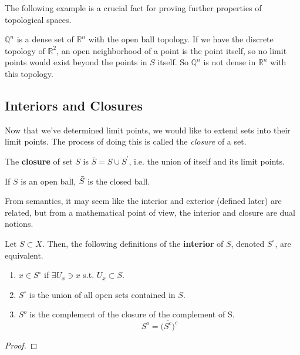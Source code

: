   The following example is a crucial fact for proving further properties of topological spaces. 

  \begin{example}
    $\mathbb{Q}^{n}$ is a dense set of $\mathbb{R}^{n}$ with the open ball topology. If we have the discrete topology of $\mathbb{R}^{2}$, an open neighborhood of a point is the point itself, so no limit points would exist beyond the points in $S$ itself. So $\mathbb{Q}^{n}$ is not dense in $\mathbb{R}^{n}$ with this topology. 
  \end{example}

\subsection{Interiors and Closures}

  Now that we've determined limit points, we would like to extend sets into their limit points. The process of doing this is called the \textit{closure} of a set. 

  \begin{definition}[Closure]
    The \textbf{closure} of set $S$ is $\overline{S} = S \cup S^\prime$, i.e. the union of itself and its limit points. 
  \end{definition}

  \begin{example}
    If $S$ is an open ball, $\Bar{S}$ is the closed ball. 
  \end{example}

  From semantics, it may seem like the interior and exterior (defined later) are related, but from a mathematical point of view, the interior and closure are dual notions. 

  \begin{definition}[Interior]
    Let $S \subset X$. Then, the following definitions of the \textbf{interior} of $S$, denoted $S^\circ$, are equivalent. 
    \begin{enumerate}
      \item $x \in S^\circ$ if $\exists U_x \ni x$ s.t. $U_x \subset S$. 
      \item $S^\circ$ is the union of all open sets contained in $S$. 
      \item $S^{o}$ is the complement of the closure of the complement of S. 
      \begin{equation}
        S^{o} = \big(\overline{S^{c}}\big)^{c}
      \end{equation}
    \end{enumerate}
  \end{definition}
  \begin{proof}
    
  \end{proof}

